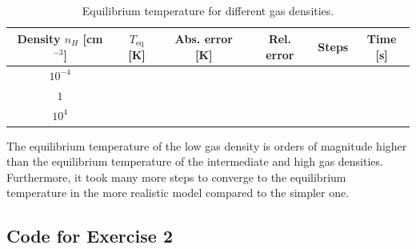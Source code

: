 \documentclass{article}
\newcommand{\CodeDir}{Code}
\newcommand{\CalcDir}{Calculations}
\begin{document}
\begin{table}[H]
\centering
\caption{Equilibrium temperature for different gas densities.}
\begin{tabular}{|c|c|c|c|c|c|}
\hline
Density \(n_H\) [cm\(^{-3}\)] & $T_\mathrm{eq}$ [K] & Abs. error [K] & Rel. error & Steps & Time [s] \\
\hline
$10^{-4}$ &  \\
$1$ &  \\
$10^4$ &  \\
\hline
\end{tabular}   
\end{table}

The equilibrium temperature of the low gas density is orders of magnitude higher than the equilibrium temperature of the intermediate and high gas densities. Furthermore, it took many more steps to converge to the equilibrium temperature in the more realistic model compared to the simpler one.


\subsection{Code for Exercise 2}

 
\end{document}
